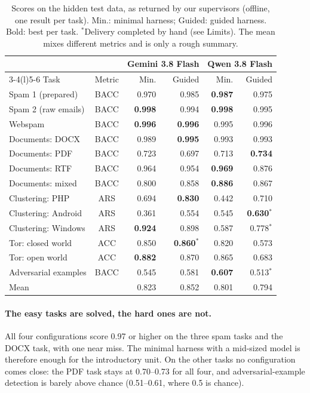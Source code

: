 \documentclass[letterpaper,twocolumn,10pt]{article}
\begin{document}
\begin{table}[t]
\centering
\footnotesize
\setlength{\tabcolsep}{3.5pt}
\begin{tabular}{@{}lcrrrr@{}}
\toprule
 & & \multicolumn{2}{c}{Gemini 3.8 Flash} & \multicolumn{2}{c}{Qwen 3.8 Flash} \\
\cmidrule(lr){3-4}\cmidrule(l){5-6}
Task & Metric & Min. & Guided & Min. & Guided \\
\midrule
Spam 1 (prepared)   & BACC & 0.970 & 0.985 & \textbf{0.987} & 0.975 \\
Spam 2 (raw emails) & BACC & \textbf{0.998} & 0.994 & \textbf{0.998} & 0.995 \\
Webspam             & BACC & \textbf{0.996} & \textbf{0.996} & 0.995 & 0.996 \\
\midrule
Documents: DOCX     & BACC & 0.989 & \textbf{0.995} & 0.993 & 0.993 \\
Documents: PDF      & BACC & 0.723 & 0.697 & 0.713 & \textbf{0.734} \\
Documents: RTF      & BACC & 0.964 & 0.954 & \textbf{0.969} & 0.876 \\
Documents: mixed    & BACC & 0.800 & 0.858 & \textbf{0.886} & 0.867 \\
\midrule
Clustering: PHP     & ARS  & 0.694 & \textbf{0.830} & 0.442 & 0.710 \\
Clustering: Android & ARS  & 0.361 & 0.554 & 0.545 & \textbf{0.630}$^{*}$ \\
Clustering: Windows & ARS  & \textbf{0.924} & 0.898 & 0.587 & 0.778$^{*}$ \\
\midrule
Tor: closed world   & ACC  & 0.850 & \textbf{0.860}$^{*}$ & 0.820 & 0.573 \\
Tor: open world     & ACC  & \textbf{0.882} & 0.870 & 0.865 & 0.683 \\
\midrule
Adversarial examples & BACC & 0.545 & 0.581 & \textbf{0.607} & 0.513$^{*}$ \\
\midrule
Mean                &      & 0.823 & 0.852 & 0.801 & 0.794 \\
\bottomrule
\end{tabular}
\caption{Scores on the hidden test data, as returned by our supervisors
(offline, one result per task). Min.: minimal harness; Guided: guided
harness. Bold: best per task. $^{*}$Delivery completed by hand (see Limits).
The mean mixes different metrics and is only a rough summary.}
\label{tab:scores}
\end{table}

\paragraph{The easy tasks are solved, the hard ones are not.} All four
configurations score 0.97 or higher on the three spam tasks and the DOCX
task, with one near miss. The minimal harness with a mid-sized model is
therefore enough for the introductory unit. On the other tasks no
configuration comes close: the PDF task stays at 0.70--0.73 for all four,
and adversarial-example detection is barely above chance (0.51--0.61, where
0.5 is chance).
\end{document}
